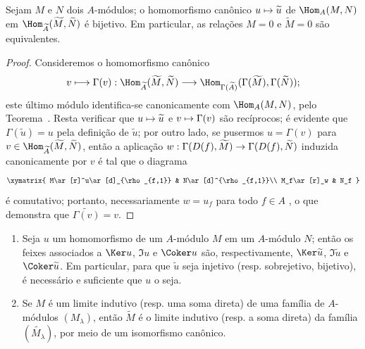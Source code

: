 \documentclass[oneside]{amsart}
\makeatletter
\newcommand{\ega@arrow}[2]{\mathchoice{#1}{#2}{#2}{#2}}
\let\ega@shortmapsto\mapsto
\renewcommand{\to}{\ega@arrow{\longrightarrow}{\rightarrow}}
\renewcommand{\mapsto}{\ega@arrow{\longmapsto}{\ega@shortmapsto}}
\let\EGAOriginalLabel\label
\renewcommand{\label}[1]{\phantomsection\EGAOriginalLabel{#1}}
\makeatother
\begin{document}
\begin{corollary}[1.3.8]
\label{I.1.3.8}
Sejam $M$ e $N$ dois $A$-módulos;
o homomorfismo canônico $u\mapsto\widetilde{u}$ de $\Hom_A(M,N)$ em $\Hom_{\widetilde{A}}(\widetilde{M},\widetilde{N})$ é bijetivo.
Em particular, as relações $M=0$ e $\widetilde{M}=0$ são equivalentes.
\end{corollary}

\begin{proof}
Consideremos o homomorfismo canônico
\[
  v\longmapsto\Gamma(v):
  \Hom_{\widetilde{A}}(\widetilde{M},\widetilde{N})
  \longrightarrow
  \Hom_{\Gamma(\widetilde{A})}(\Gamma(\widetilde{M}),\Gamma(\widetilde{N}));
\]
este último módulo identifica-se canonicamente com $\Hom_A(M,N)$, pelo Teorema~.
Resta verificar que $u\mapsto\widetilde{u}$ e $v\mapsto\Gamma(v)$ são recíprocos;
é evidente que $\Gamma(\widetilde{u})=u$ pela definição de $\widetilde{u}$;
por outro lado, se pusermos $u=\Gamma(v)$ para $v\in\Hom_{\widetilde{A}}(\widetilde{M},\widetilde{N})$, então a aplicação $w:\Gamma(D(f),\widetilde{M})\to\Gamma(D(f),\widetilde{N})$ induzida canonicamente por $v$ é tal que o diagrama
\[
  \xymatrix{
    M\ar[r]^u\ar[d]_{\rho_{f,1}} & N\ar[d]^{\rho_{f,1}}\\
    M_f\ar[r]_w & N_f
  }
\]
é comutativo;
portanto, necessariamente $w=u_f$ para todo $f\in A$ , o que demonstra que $\widetilde{\Gamma(v)}=v$.
\end{proof}

\begin{corollary}[1.3.9]
\label{I.1.3.9}
\medskip\noindent
\begin{enumerate}
  \item[{\rm(i)}] Seja $u$ um homomorfismo de um $A$-módulo $M$ em um $A$-módulo $N$;
    então os feixes associados a $\Ker u$, $\Im u$ e $\Coker u$ são, respectivamente, $\Ker\widetilde{u}$, $\Im\widetilde{u}$ e $\Coker\widetilde{u}$.
    Em particular, para que $\widetilde{u}$ seja injetivo (resp. sobrejetivo, bijetivo), é necessário e suficiente que $u$ o seja.
  \item[{\rm(ii)}] Se $M$ é um limite indutivo (resp. uma soma direta) de uma família de $A$-módulos $(M_\lambda)$, então $\widetilde{M}$ é o limite indutivo (resp. a soma direta) da família $(\widetilde{M_\lambda})$, por meio de um isomorfismo canônico.
\end{enumerate}
\end{corollary}
\end{document}
